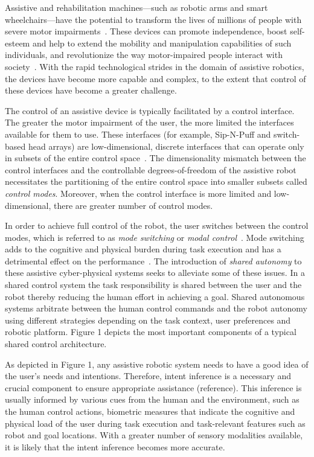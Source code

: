 Assistive and rehabilitation machines---such as robotic arms and smart wheelchairs---have the potential to transform the lives of millions of people with severe motor impairments~\cite{laplante1992assistive}. These devices can promote independence, boost self-esteem and help to extend the mobility and manipulation capabilities of such individuals, and revolutionize the way motor-impaired people interact with society~\cite{scherer1996outcomes, huete2012personal}. With the rapid technological strides in the domain of assistive robotics, the devices have become more capable and complex, to the extent that control of these devices have become a greater challenge. 

The control of an assistive device is typically facilitated by a control interface. The greater the motor impairment of the user, the more limited the interfaces available for them to use. These interfaces (for example, Sip-N-Puff and switch-based head arrays) are low-dimensional, discrete interfaces that can operate only in subsets of the entire control space~\cite{simpson2008tooth, nuttin2002selection}. 
The dimensionality mismatch between the control interfaces and the controllable degrees-of-freedom of the assistive robot necessitates the partitioning of the entire control space into smaller subsets called \textit{control modes}. Moreover, when the control interface is more limited and low-dimensional, there are greater number of control modes. 

In order to achieve full control of the robot, the user switches between the control modes, which is referred to as \textit{mode switching} or \textit{modal control}~\cite{herlant2016assistive}. Mode switching adds to the cognitive and physical burden during task execution and has a detrimental effect on the performance~\cite{eftring1999technical}. The introduction of \textit{shared autonomy} to these assistive cyber-physical systems seeks to alleviate some of these issues. In a shared control system the task responsibility is shared between the user and the robot thereby reducing the human effort in achieving a goal. Shared autonomous systems arbitrate between the human control commands and the robot autonomy using different strategies depending on the task context, user preferences and robotic platform. Figure 1 depicts the most important components of a  typical shared control architecture.

As depicted in Figure 1, any assistive robotic system needs to have a good idea of the user's needs and intentions. Therefore, intent inference is a necessary and crucial component to ensure appropriate assistance (reference). This inference is usually informed by various cues from the human and the environment, such as the human control actions, biometric measures that indicate the cognitive and physical load of the user during task execution and task-relevant features such as robot and goal locations. With a greater number of sensory modalities available, it is likely that the intent inference becomes more accurate. 

